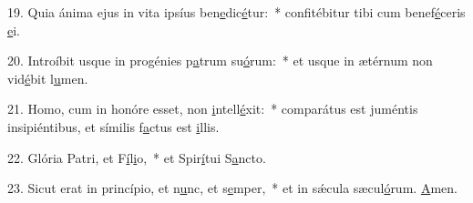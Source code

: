19. Quia ánima ejus in vita ipsíus ben\uline{e}dic\uline{é}tur:~* confitébitur tibi cum benef\uline{é}ceris \uline{e}i.\par 
20. Introíbit usque in progénies p\uline{a}trum su\uline{ó}rum:~* et usque in ætérnum non vid\uline{é}bit l\uline{u}men.\par 
21. Homo, cum in honóre esset, non \uline{i}ntell\uline{é}xit:~* comparátus est juméntis insipiéntibus, et símilis f\uline{a}ctus est \uline{i}llis.\par 
22. Glória Patri, et F\uline{í}l\uline{i}o,~* et Spir\uline{í}tui S\uline{a}ncto.\par 
23. Sicut erat in princípio, et n\uline{u}nc, et s\uline{e}mper,~* et in sǽcula sæcul\uline{ó}rum. \uline{A}men.\par 
